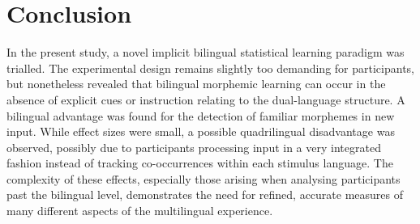 \section{Conclusion}
\label{Conclusion}
\setlength{\parindent}{20pt}
\justifying

\noindent
In the present study, a novel implicit bilingual statistical learning paradigm was trialled. The experimental design remains slightly too demanding for participants, but nonetheless revealed that bilingual morphemic learning can occur in the absence of explicit cues or instruction relating to the dual-language structure. A bilingual advantage was found for the detection of familiar morphemes in new input. While effect sizes were small, a possible quadrilingual disadvantage was observed, possibly due to participants processing input in a very integrated fashion instead of tracking co-occurrences within each stimulus language. The complexity of these effects, especially those arising when analysing participants past the bilingual level, demonstrates the need for refined, accurate measures of many different aspects of the multilingual experience.